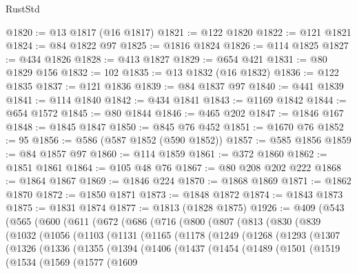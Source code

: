 \begin{lexlean}{RustStd}
\begin{coremodule}
@1820 := @13 @1817 (@16 @1817)
@1821 := @122 @1820
@1822 := @121 @1821
@1824 := @84 @1822 @97
@1825 := @1816 @1824
@1826 := @114 @1825
@1827 := @434 @1826
@1828 := @413 @1827
@1829 := @654 @421
@1831 := @80 @1829 @156
@1832 := 102
@1835 := @13 @1832 (@16 @1832)
@1836 := @122 @1835
@1837 := @121 @1836
@1839 := @84 @1837 @97
@1840 := @441 @1839
@1841 := @114 @1840
@1842 := @434 @1841
@1843 := @1169 @1842
@1844 := @654 @1572
@1845 := @80 @1844
@1846 := @465 @202
@1847 := @1846 @167
@1848 := @1845 @1847
@1850 := @845 @76 @452
@1851 := @1670 @76
@1852 := 95
@1856 := @586 (@587 @1852 (@590 @1852))
@1857 := @585 @1856
@1859 := @84 @1857 @97
@1860 := @114 @1859
@1861 := @372 @1860
@1862 := @1851 @1861
@1864 := @105 @48 @76
@1867 := @80 @208 @202 @222
@1868 := @1864 @1867
@1869 := @1846 @224
@1870 := @1868 @1869
@1871 := @1862 @1870
@1872 := @1850 @1871
@1873 := @1848 @1872
@1874 := @1843 @1873
@1875 := @1831 @1874
@1877 := @1813 (@1828 @1875)
@1926 := @409
    (@543
      (@565
        (@600
          (@611
            (@672
              (@686
                (@716
                  (@800
                    (@807
                      (@813
                        (@830
                          (@839
                            (@1032
                              (@1056
                                (@1103
                                  (@1131
                                    (@1165
                                      (@1178
                                        (@1249
                                          (@1268
                                            (@1293
                                              (@1307
                                                (@1326
                                                  (@1336
                                                    (@1355
                                                      (@1394
                                                        (@1406
                                                          (@1437
                                                            (@1454
                                                              (@1489
                                                                (@1501
                                                                  (@1519
                                                                    (@1534
                                                                      (@1569
                                                                        (@1577
                                                                          (@1609

\end{coremodule}
\end{lexlean}

